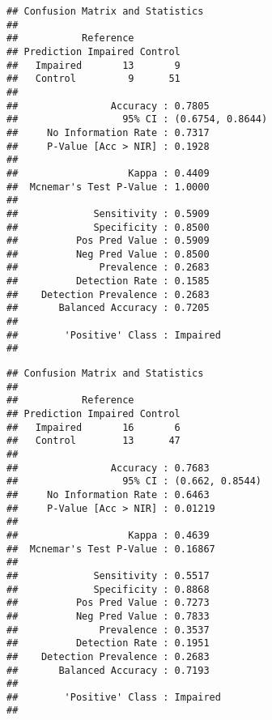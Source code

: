 \documentclass[]{article}
\newenvironment{Shaded}{\begin{snugshade}}{\end{snugshade}}
\newcommand{\KeywordTok}[1]{\textcolor[rgb]{0.13,0.29,0.53}{\textbf{#1}}}
\newcommand{\CommentTok}[1]{\textcolor[rgb]{0.56,0.35,0.01}{\textit{#1}}}
\newcommand{\OperatorTok}[1]{\textcolor[rgb]{0.81,0.36,0.00}{\textbf{#1}}}
\newcommand{\NormalTok}[1]{#1}
\begin{document}
\begin{verbatim}
## Confusion Matrix and Statistics
## 
##           Reference
## Prediction Impaired Control
##   Impaired       13       9
##   Control         9      51
##                                           
##                Accuracy : 0.7805          
##                  95% CI : (0.6754, 0.8644)
##     No Information Rate : 0.7317          
##     P-Value [Acc > NIR] : 0.1928          
##                                           
##                   Kappa : 0.4409          
##  Mcnemar's Test P-Value : 1.0000          
##                                           
##             Sensitivity : 0.5909          
##             Specificity : 0.8500          
##          Pos Pred Value : 0.5909          
##          Neg Pred Value : 0.8500          
##              Prevalence : 0.2683          
##          Detection Rate : 0.1585          
##    Detection Prevalence : 0.2683          
##       Balanced Accuracy : 0.7205          
##                                           
##        'Positive' Class : Impaired        
## 
\end{verbatim}

\begin{Shaded}
\end{Shaded}

\begin{verbatim}
## Confusion Matrix and Statistics
## 
##           Reference
## Prediction Impaired Control
##   Impaired       16       6
##   Control        13      47
##                                          
##                Accuracy : 0.7683         
##                  95% CI : (0.662, 0.8544)
##     No Information Rate : 0.6463         
##     P-Value [Acc > NIR] : 0.01219        
##                                          
##                   Kappa : 0.4639         
##  Mcnemar's Test P-Value : 0.16867        
##                                          
##             Sensitivity : 0.5517         
##             Specificity : 0.8868         
##          Pos Pred Value : 0.7273         
##          Neg Pred Value : 0.7833         
##              Prevalence : 0.3537         
##          Detection Rate : 0.1951         
##    Detection Prevalence : 0.2683         
##       Balanced Accuracy : 0.7193         
##                                          
##        'Positive' Class : Impaired       
## 
\end{verbatim}
\end{document}
